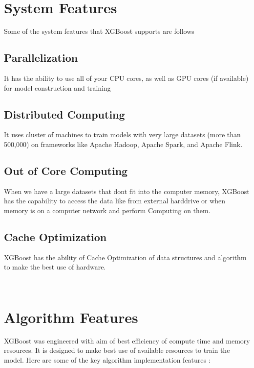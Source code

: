 

\section{System Features}

Some of the system features that XGBoost supports are follows 

\subsection{Parallelization}

It has the ability to use all of your CPU cores, as well as GPU cores (if
available) for model construction and training

\subsection{Distributed Computing}

It uses cluster of machines to train models with very large datasets (more than
500,000) on frameworks like Apache Hadoop, Apache Spark, and Apache Flink.

\subsection{Out of Core Computing}

When we have a large datasets that dont fit into the computer memory, XGBoost
has the capability to access the data  like from external harddrive or when
memory is on a computer network and perform Computing on them.

\subsection{Cache Optimization}  XGBoost has the ability of Cache Optimization
of data structures and algorithm to make the best use of hardware.

~\cite{hid-sp18-401-XGBoost-MLmastery}

\section{Algorithm Features} 

XGBoost was engineered with aim of best efficiency of compute time and memory
resources. It is designed to make best use of available resources to train the
model. Here are some of the key algorithm implementation features :


